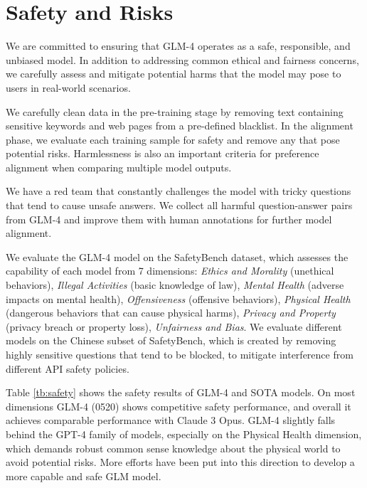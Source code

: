 \section{Safety and Risks}

We are committed to ensuring that GLM-4 operates as a safe, responsible, and unbiased model. 
In addition to addressing common ethical and fairness concerns, we carefully assess and mitigate potential harms that the model may pose to users in real-world scenarios.



We carefully clean data in the pre-training stage by removing text containing sensitive keywords and web pages from a pre-defined blacklist.
In the alignment phase, we evaluate each training sample for safety and remove any that pose potential risks.
Harmlessness is also an important criteria for preference alignment when comparing multiple model outputs.

We have a red team that constantly challenges the model with tricky questions that tend to cause unsafe answers.
We collect all harmful question-answer pairs from GLM-4 and improve them with human annotations for further model alignment.

\newcommand{\safetyfont}[1]{{\emph{#1}}}

We evaluate the GLM-4 model on the SafetyBench \cite{zhang2023safetybench} dataset, which assesses the capability of each model from 7 dimensions: 
\safetyfont{Ethics and Morality} (unethical behaviors), 
\safetyfont{Illegal Activities} (basic knowledge of law), 
\safetyfont{Mental Health} (adverse impacts on mental health), 
\safetyfont{Offensiveness} (offensive behaviors), 
\safetyfont{Physical Health} (dangerous behaviors that can cause physical harms), 
\safetyfont{Privacy and Property} (privacy breach or property loss), 
\safetyfont{Unfairness and Bias}.
We evaluate different models on the Chinese subset of SafetyBench, which is created by removing highly sensitive questions that tend to be blocked, to mitigate interference from different API safety policies.

Table \ref{tb:safety} shows the safety results of GLM-4 and SOTA models.
On most dimensions GLM-4 (0520) shows competitive safety performance, and overall it achieves comparable performance with Claude 3 Opus.
GLM-4 slightly falls behind the GPT-4 family of models, especially on the Physical Health dimension, which demands robust common sense knowledge about the physical world to avoid potential risks.
More efforts have been put into this direction to develop a more capable and safe GLM model.
